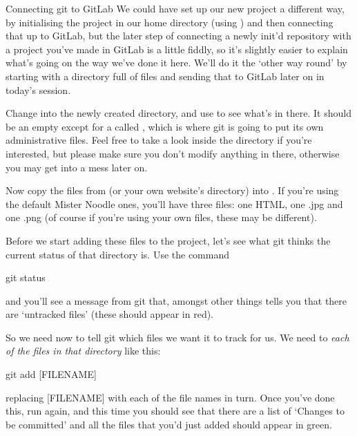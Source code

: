 \begin{diversion}{Connecting git to GitLab}
We could have set up our new project a different way, by initialising the project in our home directory (using ) and then connecting that up to GitLab, but the later step of connecting a newly init'd repository with a project you've made in GitLab is a little fiddly, so it's slightly easier to explain what's going on the way we've done it here. We'll do it the `other way round' by starting with a directory full of files and sending that to GitLab later on in today's session. 
\end{diversion}

Change into the newly created  directory, and use  to see what's in there. It should be an empty except for a  called , which is where git is going to put its own administrative files. Feel free to take a look inside the  directory if you're interested, but please make sure you don't modify anything in there, otherwise you may get into a mess later on. 

Now copy the files from  (or your own website's directory) into . If you're using the default Mister Noodle ones, you'll have three files: one HTML, one .jpg and one .png (of course if you're using your own files, these may be different). 

Before we start adding these files to the project, let's see what git thinks the current status of that directory is. Use the  command 

\begin{ttoutenv}
git status
\end{ttoutenv}

and you'll see a message from git that, amongst other things tells you that there are `untracked files' (these should appear in red). 

So we need now to tell git which files we want it to track for us. We need to  \emph{each of the files in that directory} like this:

\begin{ttoutenv}
git add [FILENAME]
\end{ttoutenv}


replacing [FILENAME] with each of the file names in turn. Once you've done this, run  again, and this time you should see that there are a list of `Changes to be committed' and all the files that you'd just added should appear in green. 

